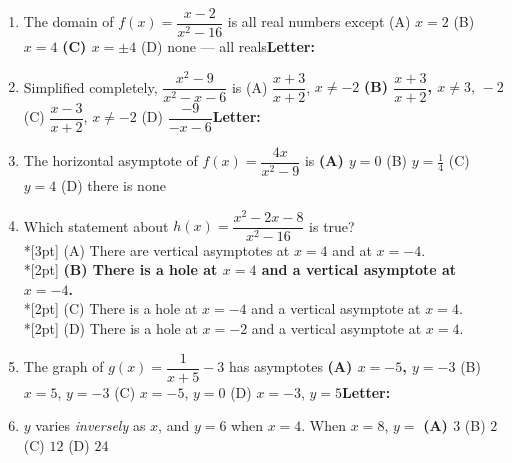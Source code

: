 \documentclass[10pt]{article}
\begin{document}
\begin{enumerate}[leftmargin=1.9em, itemsep=9pt]
  \item The domain of $f(x)=\dfrac{x-2}{x^2-16}$ is all real numbers except
    \hfill (A) $x=2$ \quad (B) $x=4$ \quad \textbf{(C) $x=\pm 4$} \ans{$\leftarrow$} \quad (D) none --- all reals\nobreak\hfill\mbox{\small\textbf{Letter:}\ \choicebox{\gradedblank[id=qb1, type=choice, points=2, answer={C}]{0.4in}{10pt}}}
  \item Simplified completely, $\dfrac{x^2-9}{x^2-x-6}$ is
    \hfill (A) $\dfrac{x+3}{x+2}$, $x\ne -2$ \quad \textbf{(B) $\dfrac{x+3}{x+2}$, $x\ne 3,\,-2$} \ans{$\leftarrow$} \quad (C) $\dfrac{x-3}{x+2}$, $x\ne -2$ \quad (D) $\dfrac{-9}{-x-6}$\nobreak\hfill\mbox{\small\textbf{Letter:}\ \choicebox{\gradedblank[id=qb2, type=choice, points=2, answer={B}]{0.4in}{10pt}}}
  \item The horizontal asymptote of $f(x)=\dfrac{4x}{x^2-9}$ is
    \hfill \llap{\choicebox{\gradedblank[id=qb3, type=choice, points=2, answer={A}]{0.2in}{10pt}}\,}\textbf{(A) $y=0$} \ans{$\leftarrow$} \quad (B) $y=\frac14$ \quad (C) $y=4$ \quad (D) there is none
  \item {}Which statement about $h(x)=\dfrac{x^2-2x-8}{x^2-16}$ is true?
    \\*[3pt]\hspace*{1.2em} (A) There are vertical asymptotes at $x=4$ and at $x=-4$.
    \\*[2pt]\hspace*{1.2em} \textbf{(B) There is a hole at $x=4$ and a vertical asymptote at $x=-4$.} \ans{$\leftarrow$}
    \\*[2pt]\hspace*{1.2em} (C) There is a hole at $x=-4$ and a vertical asymptote at $x=4$.
    \\*[2pt]\hspace*{1.2em} (D) There is a hole at $x=-2$ and a vertical asymptote at $x=4$.
  \item The graph of $g(x)=\dfrac{1}{x+5}-3$ has asymptotes
    \hfill \textbf{(A) $x=-5$, $y=-3$} \ans{$\leftarrow$} \quad (B) $x=5$, $y=-3$ \quad (C) $x=-5$, $y=0$ \quad (D) $x=-3$, $y=5$\nobreak\hfill\mbox{\small\textbf{Letter:}\ \choicebox{\gradedblank[id=qb5, type=choice, points=2, answer={A}]{0.4in}{10pt}}}
  \item $y$ varies \emph{inversely} as $x$, and $y=6$ when $x=4$. When $x=8$, $y=$
    \hfill \llap{\choicebox{\gradedblank[id=qb6, type=choice, points=2, answer={A}]{0.35in}{10pt}}\enspace}\textbf{(A) $3$} \ans{$\leftarrow$} \quad (B) $2$ \quad (C) $12$ \quad (D) $24$
\end{enumerate}
\end{document}
